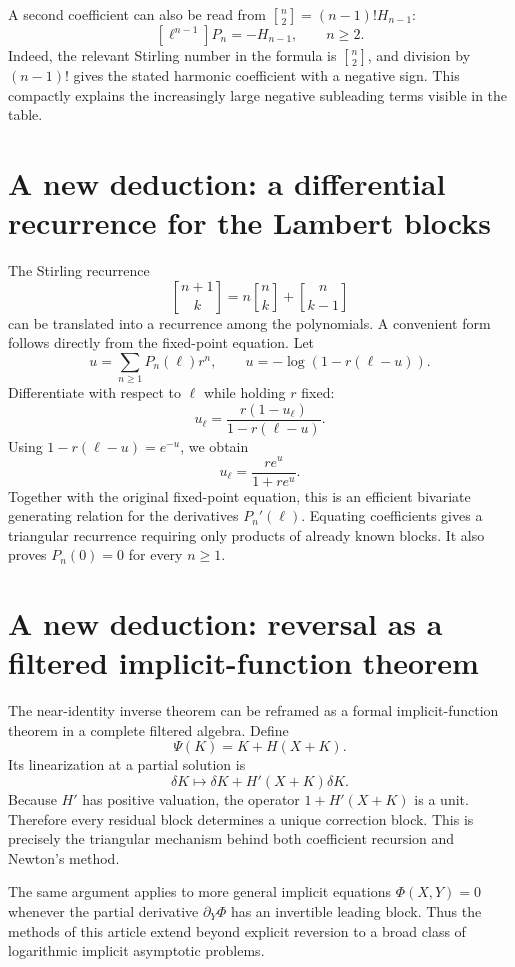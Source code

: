 \documentclass[11pt,openany]{book}
\theoremstyle{definition}
\theoremstyle{plain}
\theoremstyle{remark}
\newcommand{\stirlingone}[2]{\genfrac{[}{]}{0pt}{}{#1}{#2}}
\begin{document}
A second coefficient can also be read from \(\stirlingone{n}{2}=(n-1)!H_{n-1}\):
\begin{equation}\label{eq:Pn-next-leading}
 [\ell^{n-1}]P_n
 =-H_{n-1},
 \qquad n\ge2.
\end{equation}
Indeed, the relevant Stirling number in the formula is \(\stirlingone{n}{2}\), and division by \((n-1)!\) gives the stated harmonic coefficient with a negative sign. This compactly explains the increasingly large negative subleading terms visible in the table.

\section{A new deduction: a differential recurrence for the Lambert blocks}
The Stirling recurrence
\[
 \stirlingone{n+1}{k}=n\stirlingone{n}{k}+\stirlingone{n}{k-1}
\]
can be translated into a recurrence among the polynomials. A convenient form follows directly from the fixed-point equation. Let
\[
 u=\sum_{n\ge1}P_n(\ell)r^n,
 \qquad
 u=-\log(1-r(\ell-u)).
\]
Differentiate with respect to \(\ell\) while holding \(r\) fixed:
\[
 u_\ell=\frac{r(1-u_\ell)}{1-r(\ell-u)}.
\]
Using \(1-r(\ell-u)=e^{-u}\), we obtain
\begin{equation}\label{eq:Lambert-generating-differential}
 u_\ell=\frac{re^u}{1+re^u}.
\end{equation}
Together with the original fixed-point equation, this is an efficient bivariate generating relation for the derivatives \(P_n'(\ell)\). Equating coefficients gives a triangular recurrence requiring only products of already known blocks. It also proves \(P_n(0)=0\) for every \(n\ge1\).

\section{A new deduction: reversal as a filtered implicit-function theorem}
The near-identity inverse theorem can be reframed as a formal implicit-function theorem in a complete filtered algebra. Define
\[
 \Psi(K)=K+H(X+K).
\]
Its linearization at a partial solution is
\[
 \delta K\longmapsto \delta K+H'(X+K)\delta K.
\]
Because \(H'\) has positive valuation, the operator \(1+H'(X+K)\) is a unit. Therefore every residual block determines a unique correction block. This is precisely the triangular mechanism behind both coefficient recursion and Newton's method.

The same argument applies to more general implicit equations \(\Phi(X,Y)=0\) whenever the partial derivative \(\partial_Y\Phi\) has an invertible leading block. Thus the methods of this article extend beyond explicit reversion to a broad class of logarithmic implicit asymptotic problems.
\end{document}
